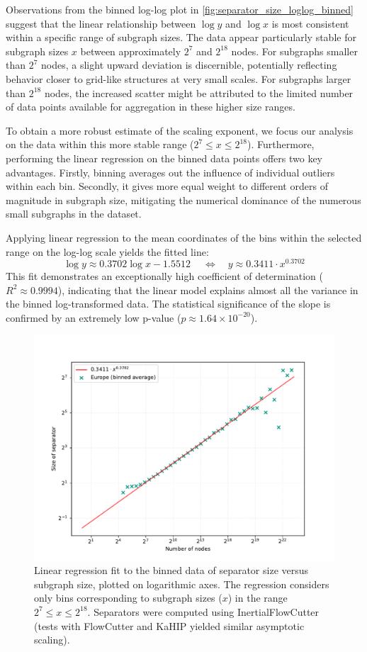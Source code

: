 Observations from the binned log-log plot in \cref{fig:separator_size_loglog_binned} suggest that the linear relationship between \( \log y \) and \( \log x \) is most consistent within a specific range of subgraph sizes.
The data appear particularly stable for subgraph sizes \( x \) between approximately \( 2^7 \) and \( 2^{18} \) nodes.
For subgraphs smaller than \( 2^7 \) nodes, a slight upward deviation is discernible, potentially reflecting behavior closer to grid-like structures at very small scales.
For subgraphs larger than \( 2^{18} \) nodes, the increased scatter might be attributed to the limited number of data points available for aggregation in these higher size ranges.

To obtain a more robust estimate of the scaling exponent, we focus our analysis on the data within this more stable range (\( 2^7 \le x \le 2^{18} \)).
Furthermore, performing the linear regression on the binned data points offers two key advantages.
Firstly, binning averages out the influence of individual outliers within each bin.
Secondly, it gives more equal weight to different orders of magnitude in subgraph size, mitigating the numerical dominance of the numerous small subgraphs in the dataset.

Applying linear regression to the mean coordinates of the bins within the selected range on the log-log scale yields the fitted line:
\[ \log y \approx 0.3702 \log x - 1.5512\ \quad\iff\quad y \approx 0.3411 \cdot x^{0.3702}\]
This fit demonstrates an exceptionally high coefficient of determination (\( R^2 \approx 0.9994 \)), indicating that the linear model explains almost all the variance in the binned log-transformed data.
The statistical significance of the slope is confirmed by an extremely low p-value (\( p \approx 1.64 \times 10^{-20} \)).

\begin{figure}[tbhp]
    \centering
    \includegraphics[width=0.7\linewidth]{graphics/EuropeShowFit.pdf}
    \caption{Linear regression fit to the binned data of separator size versus subgraph size, plotted on logarithmic axes. The regression considers only bins corresponding to subgraph sizes (\(x\)) in the range \( 2^7 \le x \le 2^{18} \). Separators were computed using InertialFlowCutter (tests with FlowCutter and KaHIP yielded similar asymptotic scaling).}
    \label{fig:separator_size_loglog_fit}
\end{figure}

